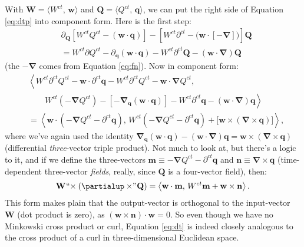 \documentclass[12pt]{article}
\renewcommand{\vv}[1]{\mathbf{#1}}
\newcommand{\del}{\boldsymbol{\nabla}}
\begin{document}
With $\vv W = \langle W^{ct}, \, \vv w \rangle$ and $\vv Q = \langle Q^{ct} , \, \vv q \rangle$, we can put the right side of Equation \ref{eq:dtp} into component form. Here is the first step:
\begin{equation*}
\begin{split}
&\partialup_{\vv Q} \left[ W^{ct} Q^{ct} - \left( \vv w \cdot \vv q \right) \right] - \left[ W^{ct} \partial^{ct} - \big(  \vv w \cdot [ - \del ] \big) \right] \vv Q \\[8pt]
&= W^{ct} \partialup Q^{ct} - \partialup_{\vv q} ( \vv w \cdot \vv q ) - W^{ct} \partial^{ct} \vv Q - ( \vv w \cdot \del ) \vv Q
\end{split}
\end{equation*}
(the $-\del$ comes from Equation \ref{eq:fn}). Now in component form:
\begin{equation*}
\begin{split}
& \left \langle W^{ct} \partial^{ct} Q^{ct} - \vv w \cdot \partial^{ct} \vv q - W^{ct} \partial^{ct} Q^{ct} - \vv w \cdot \del Q^{ct} , \right. \\[3pt]
& \qquad \left. W^{ct} (- \del Q^{ct}) - [- \del_{\vv q} (\vv w \cdot \vv q)]  -  W^{ct} \partial^{ct} \vv q - (\vv w \cdot \del) \vv q \right \rangle \\[10pt]
&= \left \langle \vv w \cdot \left( - \del Q^{ct} - \partial^{ct} \vv q  \right) , \, W^{ct} \left( - \del Q^{ct} - \partial^{ct} \vv q \right) + \big[ \vv w \times (\del \times \vv q) \big] \right \rangle ,
\end{split}
\end{equation*}
where we've again used the identity $\del_{\vv q} (\vv w \cdot \vv q) - (\vv w \cdot \del) \vv q = \vv w \times (\del \times \vv q)$ (differential \emph{three}-vector triple product). Not much to look at, but there's a logic to it, and if we define the three-vectors ${\vv m \equiv - \del Q^{ct} - \partial^{ct} \vv q}$ and ${\vv n \equiv \del \times \vv q}$ (time-dependent three-vector \emph{fields}, really, since $\vv Q$ is a four-vector field), then:
\begin{equation}\label{eq:dt}
\vv W \mkern1mu `` \mkern-4mu \times (\partialup \times \mkern-4mu " \mkern1mu \vv Q) = \left \langle \vv w \cdot \vv m , \, W^{ct} \vv m + \vv w \times \vv n \right \rangle .
\end{equation}
This form makes plain that the output-vector is orthogonal to the input-vector $\vv W$ (dot product is zero), as $(\vv w \times \vv n) \cdot \vv w = 0$. So even though we have no Minkowski cross product or curl, Equation \ref{eq:dt} is indeed closely analogous to the cross product of a curl in three-dimensional Euclidean space.
\end{document}
